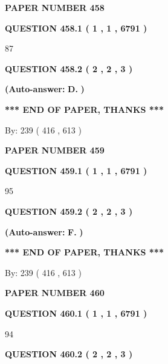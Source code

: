 \documentclass{ctexart}
\begin{document}
   
\newpage 
\setcounter{page}{ 
   458001 } 
   
   
 {\textbf{ \Large{ PAPER NUMBER  458  }}}
   
   
   
   
  
  
{\textbf{\large{QUESTION
458.1 
 ( 1 , 1 , 6791 )
}}}

87
  
  
{\textbf{\large{QUESTION
458.2 
 ( 2 , 2 , 3 )
}}}
 
 
{\textbf{(Auto-answer:}}
{\textbf{\large{
D.}}}
{\textbf{)}}
 
 
   
   
   
   
\vspace{1.0in} 
{\textbf{\large{ *** END OF PAPER, THANKS *** }}} 
   
   
\hspace{1.0in} By: 
 239 ( 416 ,  613 )
   
   
   
   
\newpage 
\setcounter{page}{ 
   459001 } 
   
   
 {\textbf{ \Large{ PAPER NUMBER  459  }}}
   
   
   
   
  
  
{\textbf{\large{QUESTION
459.1 
 ( 1 , 1 , 6791 )
}}}

95
  
  
{\textbf{\large{QUESTION
459.2 
 ( 2 , 2 , 3 )
}}}
 
 
{\textbf{(Auto-answer:}}
{\textbf{\large{
F.}}}
{\textbf{)}}
 
 
   
   
   
   
\vspace{1.0in} 
{\textbf{\large{ *** END OF PAPER, THANKS *** }}} 
   
   
\hspace{1.0in} By: 
 239 ( 416 ,  613 )
   
   
   
   
\newpage 
\setcounter{page}{ 
   460001 } 
   
   
 {\textbf{ \Large{ PAPER NUMBER  460  }}}
   
   
   
   
  
  
{\textbf{\large{QUESTION
460.1 
 ( 1 , 1 , 6791 )
}}}

94
  
  
{\textbf{\large{QUESTION
460.2 
 ( 2 , 2 , 3 )
}}}
 
\end{document}

